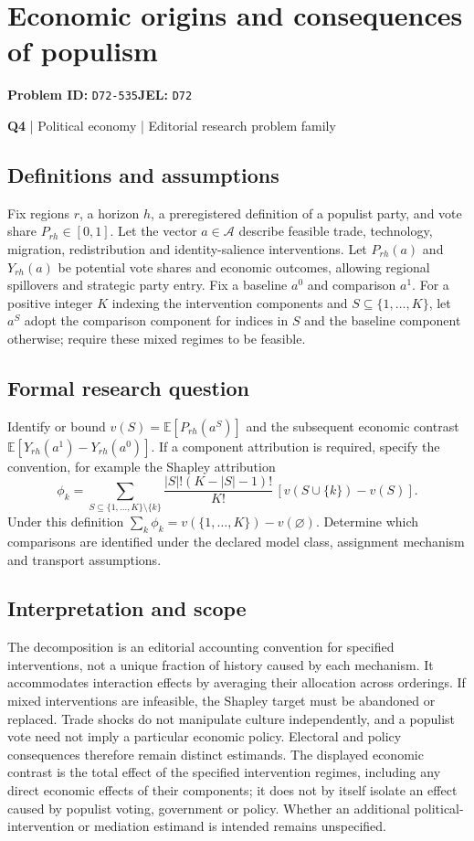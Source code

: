 \documentclass[11pt,a4paper]{article}
\begin{document}
\section*{Economic origins and consequences of populism}
\textbf{Problem ID:} \texttt{D72-535}\quad \textbf{JEL:} \texttt{D72}\par
\label{problem:OP-0124}
\label{atlas:prob:Q4}
{\sffamily\small\color{muted}\textbf{Q4} | Political economy | Editorial research problem family\par}
\subsection*{Definitions and assumptions}
Fix regions $r$, a horizon $h$, a preregistered definition of a populist party, and vote share $P_{rh}\in[0,1]$. Let the vector $a\in\mathcal A$ describe feasible trade, technology, migration, redistribution and identity-salience interventions. Let $P_{rh}(a)$ and $Y_{rh}(a)$ be potential vote shares and economic outcomes, allowing regional spillovers and strategic party entry. Fix a baseline $a^0$ and comparison $a^1$. For a positive integer $K$ indexing the intervention components and $S\subseteq\{1,\ldots,K\}$, let $a^S$ adopt the comparison component for indices in $S$ and the baseline component otherwise; require these mixed regimes to be feasible.
\subsection*{Formal research question}
Identify or bound $v(S)=\mathbb E[P_{rh}(a^S)]$ and the subsequent economic contrast $\mathbb E[Y_{rh}(a^1)-Y_{rh}(a^0)]$. If a component attribution is required, specify the convention, for example the Shapley attribution
\[
\phi_k=\sum_{S\subseteq\{1,\ldots,K\}\setminus\{k\}}
\frac{|S|!(K-|S|-1)!}{K!}\,[v(S\cup\{k\})-v(S)].
\]
Under this definition $\sum_k\phi_k=v(\{1,\ldots,K\})-v(\varnothing)$. Determine which comparisons are identified under the declared model class, assignment mechanism and transport assumptions.
\subsection*{Interpretation and scope}
The decomposition is an editorial accounting convention for specified interventions, not a unique fraction of history caused by each mechanism. It accommodates interaction effects by averaging their allocation across orderings. If mixed interventions are infeasible, the Shapley target must be abandoned or replaced. Trade shocks do not manipulate culture independently, and a populist vote need not imply a particular economic policy. Electoral and policy consequences therefore remain distinct estimands. The displayed economic contrast is the total effect of the specified intervention regimes, including any direct economic effects of their components; it does not by itself isolate an effect caused by populist voting, government or policy. Whether an additional political-intervention or mediation estimand is intended remains unspecified.
\end{document}
